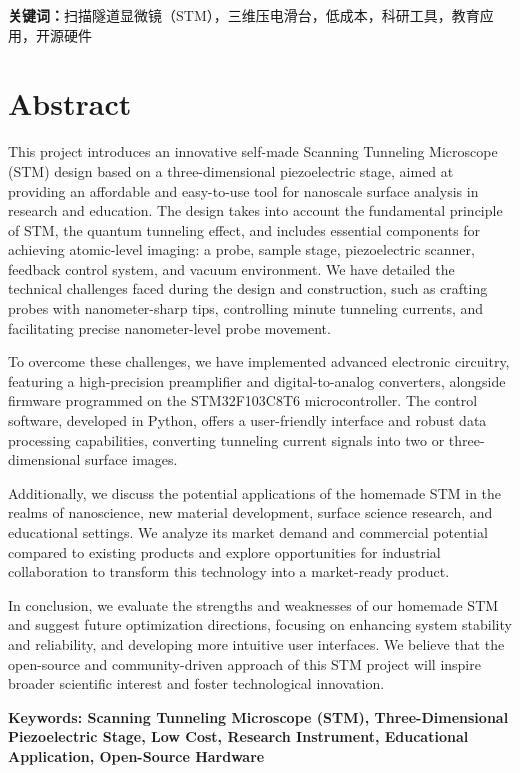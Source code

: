 \documentclass{article}
\begin{document}
\textbf{关键词：}扫描隧道显微镜（STM），三维压电滑台，低成本，科研工具，教育应用，开源硬件

\newpage
\section*{\textbf{Abstract}} %
{}
\begin{spacing}{1.5}
	\begin{adjustwidth}{0.42cm}{0.42cm}
		\setParDis %
		
		\qquad This project introduces an innovative self-made Scanning Tunneling Microscope (STM) design based on a three-dimensional piezoelectric stage, aimed at providing an affordable and easy-to-use tool for nanoscale surface analysis in research and education. The design takes into account the fundamental principle of STM, the quantum tunneling effect, and includes essential components for achieving atomic-level imaging: a probe, sample stage, piezoelectric scanner, feedback control system, and vacuum environment. We have detailed the technical challenges faced during the design and construction, such as crafting probes with nanometer-sharp tips, controlling minute tunneling currents, and facilitating precise nanometer-level probe movement.
		
		To overcome these challenges, we have implemented advanced electronic circuitry, featuring a high-precision preamplifier and digital-to-analog converters, alongside firmware programmed on the STM32F103C8T6 microcontroller. The control software, developed in Python, offers a user-friendly interface and robust data processing capabilities, converting tunneling current signals into two or three-dimensional surface images.
		
		Additionally, we discuss the potential applications of the homemade STM in the realms of nanoscience, new material development, surface science research, and educational settings. We analyze its market demand and commercial potential compared to existing products and explore opportunities for industrial collaboration to transform this technology into a market-ready product.
		
		In conclusion, we evaluate the strengths and weaknesses of our homemade STM and suggest future optimization directions, focusing on enhancing system stability and reliability, and developing more intuitive user interfaces. We believe that the open-source and community-driven approach of this STM project will inspire broader scientific interest and foster technological innovation.
		
		
		\textbf{Keywords: Scanning Tunneling Microscope (STM), Three-Dimensional Piezoelectric Stage, Low Cost, Research Instrument, Educational Application, Open-Source Hardware}
	\end{adjustwidth}
\end{spacing}
\end{document}
